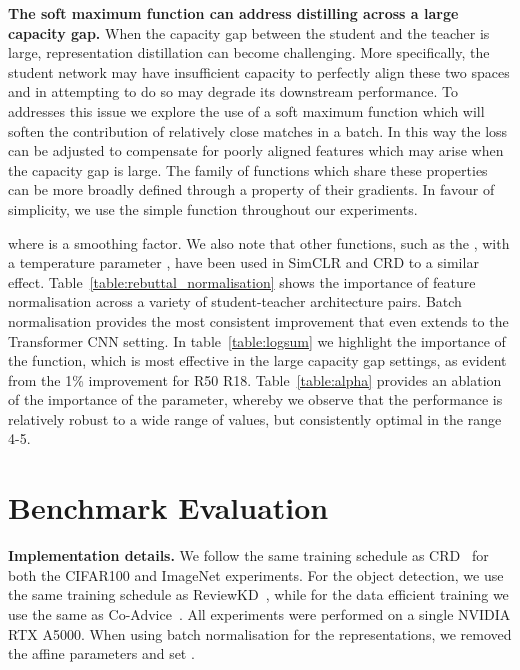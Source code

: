 \documentclass[letterpaper]{article} \usepackage[submission]{aaai23}  \usepackage{times}  \usepackage{helvet}  \usepackage{courier}  \usepackage[hyphens]{url}  \usepackage{graphicx} \urlstyle{rm} \def\UrlFont{\rm}  \usepackage{natbib}  \usepackage{caption} \frenchspacing  \setlength{\pdfpagewidth}{8.5in} \setlength{\pdfpageheight}{11in} \usepackage{algorithm}
\begin{document}
\textbf{The soft maximum function can address distilling across a large capacity gap.}
 When the capacity gap between the student and the teacher is large, representation distillation can become challenging. More specifically, the student network may have insufficient capacity to perfectly align these two spaces and in attempting to do so may degrade its downstream performance. To addresses this issue we explore the use of a soft maximum function which will soften the contribution of relatively close matches in a batch. In this way the loss can be adjusted to compensate for poorly aligned features which may arise when the capacity gap is large. The family of functions which share these properties can be more broadly defined through a property of their gradients. In favour of simplicity, we use the simple  function throughout our experiments.

 

where  is a smoothing factor. We also note that other functions, such as the , with a temperature parameter , have been used in SimCLR and CRD to a similar effect. Table~\ref{table:rebuttal_normalisation} shows the importance of feature normalisation across a variety of student-teacher architecture pairs. Batch normalisation provides the most consistent improvement that even extends to the Transformer  CNN setting. In table~\ref{table:logsum} we highlight the importance of the  function, which is most effective in the large capacity gap settings, as evident from the 1\% improvement for R50  R18. Table~\ref{table:alpha} provides an ablation of the importance of the  parameter, whereby we observe that the performance is relatively robust to a wide range of values, but consistently optimal in the range 4-5.







\section{Benchmark Evaluation}
\label{sec:benchmark_evaluation}

\textbf{Implementation details.}
We follow the same training schedule as CRD~\cite{Tian2019ContrastiveDistillation} for both the CIFAR100 and ImageNet experiments. For the object detection, we use the same training schedule as ReviewKD~\cite{Chen2021DistillingReview}, while for the data efficient training we use the same as Co-Advice~\cite{Ren2022Co-advise:Distillation}. All experiments were performed on a single NVIDIA RTX A5000. When using batch normalisation for the representations, we removed the affine parameters and set .
\end{document}
